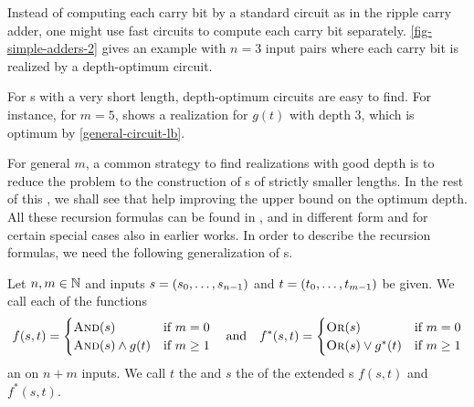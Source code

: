 Instead of computing each carry bit by a standard \aop{} circuit as in the ripple carry adder,
one might use fast \aop{} circuits to compute each carry bit separately.
\cref{fig-simple-adders-2} gives an example with $n = 3$ input pairs
where each carry bit is realized by a depth-optimum \aop{} circuit.


For \aop{}s with a very short length, depth-optimum circuits are easy to find.
For instance, for $m = 5$,
 shows a realization for $g(t)$ with depth $3$,
which is optimum by \cref{general-circuit-lb}.

For general $m$, a common strategy to find \aop{} realizations with good depth is
to reduce the problem to the construction of \aop{}s of strictly smaller lengths.
In the rest of this ,
we shall see  that help improving the upper bound on the optimum depth.
All these recursion formulas can be found in \citet{Grinchuk},
and in different form and for certain special cases also in earlier works.
In order to describe the recursion formulas,
we need the following generalization of \aop{}s.

\begin{definition}\label{def-extended-aop}
 Let $n, m \in \mathbb N$ and
 inputs ${s = \left({s_0, \dotsc, s_{n-1}}\right)}$ and ${t = \left({t_0, \dotsc, t_{m-1}}\right)}$ be given.
 We call each of the functions
 \newcommand{\longestterm}{$t_0 \land g^*\DBkt{t_1, \dotsc, t_{m-1}}$}
 \begin{align*}
  f({s, t}) = \begin{cases}
   \operatorname{\textsc{And}}(s) & \text{if } m = 0 \\
   \operatorname{\textsc{And}}(s) \land g({t}) & \text{if } m \geq 1
                \end{cases}
  \quad \text{and} \quad
  f^*({s, t}) =
  \begin{cases}
   \operatorname{\textsc{Or}}(s) & \text{if } m = 0 \\
   \operatorname{\textsc{Or}}(s) \lor g^*({t}) & \text{if } m \geq 1
                \end{cases}
 \end{align*}
 an  on $n+m$ inputs.
 We call $t$ the 
 and $s$ the  of the extended \aop{}s $f(s, t)$ and $f^*(s, t)$.
\end{definition}

